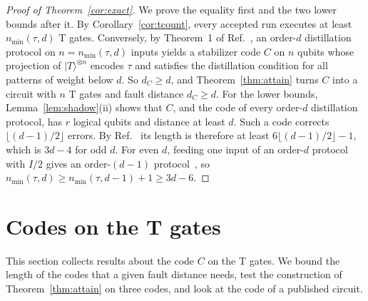 \documentclass[aps,prl,reprint,twocolumn,amsmath,amssymb,floatfix,nofootinbib,superscriptaddress]{revtex4-2}
\theoremstyle{definition}
\theoremstyle{remark}
\begin{document}
\begin{proof}[Proof of Theorem~\ref{cor:exact}]
We prove the equality first and the two lower bounds after it. By Corollary~\ref{cor:tcount}, every accepted run executes at least $n_{\min}(\tau,d)$ T gates. Conversely, by Theorem~1 of Ref.~\cite{distillationpaper}, an order-$d$ distillation protocol on $n=n_{\min}(\tau,d)$ inputs yields a stabilizer code $C$ on $n$ qubits whose projection of $|T\rangle^{\otimes n}$ encodes $\tau$ and satisfies the distillation condition for all patterns of weight below $d$. So $d_C\geq d$, and Theorem~\ref{thm:attain} turns $C$ into a circuit with $n$ T gates and fault distance $d_C\geq d$. For the lower bounds, Lemma~\ref{lem:shadow}(ii) shows that $C$, and the code of every order-$d$ distillation protocol, has $r$ logical qubits and distance at least $d$. Such a code corrects $\lfloor(d-1)/2\rfloor$ errors. By Ref.~\cite{rains} its length is therefore at least $6\lfloor(d-1)/2\rfloor-1$, which is $3d-4$ for odd $d$. For even $d$, feeding one input of an order-$d$ protocol with $I/2$ gives an order-$(d-1)$ protocol~\cite{distillationpaper}, so $n_{\min}(\tau,d)\geq n_{\min}(\tau,d-1)+1\geq3d-6$.
\end{proof}

\section{Codes on the T gates}\label{sm:codes}
This section collects results about the code $C$ on the T gates. We bound the length of the codes that a given fault distance needs, test the construction of Theorem~\ref{thm:attain} on three codes, and look at the code of a published circuit.
\end{document}
